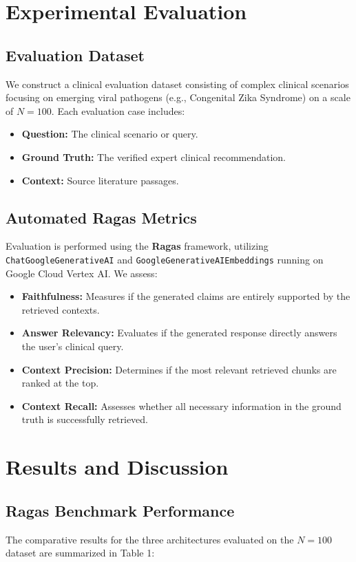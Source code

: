 \documentclass[sn-mathphys,Numbered]{sn-jnl}%
\begin{document}
\section{Experimental Evaluation}\label{sec3}

\subsection{Evaluation Dataset}
We construct a clinical evaluation dataset consisting of complex clinical scenarios focusing on emerging viral pathogens (e.g., Congenital Zika Syndrome) on a scale of $N=100$. Each evaluation case includes:
\begin{itemize}
    \item \textbf{Question:} The clinical scenario or query.
    \item \textbf{Ground Truth:} The verified expert clinical recommendation.
    \item \textbf{Context:} Source literature passages.
\end{itemize}

\subsection{Automated Ragas Metrics}
Evaluation is performed using the \textbf{Ragas} framework, utilizing \texttt{ChatGoogleGenerativeAI} and \texttt{GoogleGenerativeAIEmbeddings} running on Google Cloud Vertex AI. We assess:
\begin{itemize}
    \item \textbf{Faithfulness:} Measures if the generated claims are entirely supported by the retrieved contexts.
    \item \textbf{Answer Relevancy:} Evaluates if the generated response directly answers the user's clinical query.
    \item \textbf{Context Precision:} Determines if the most relevant retrieved chunks are ranked at the top.
    \item \textbf{Context Recall:} Assesses whether all necessary information in the ground truth is successfully retrieved.
\end{itemize}

\section{Results and Discussion}\label{sec4}

\subsection{Ragas Benchmark Performance}
The comparative results for the three architectures evaluated on the $N=100$ dataset are summarized in Table 1:
\end{document}
